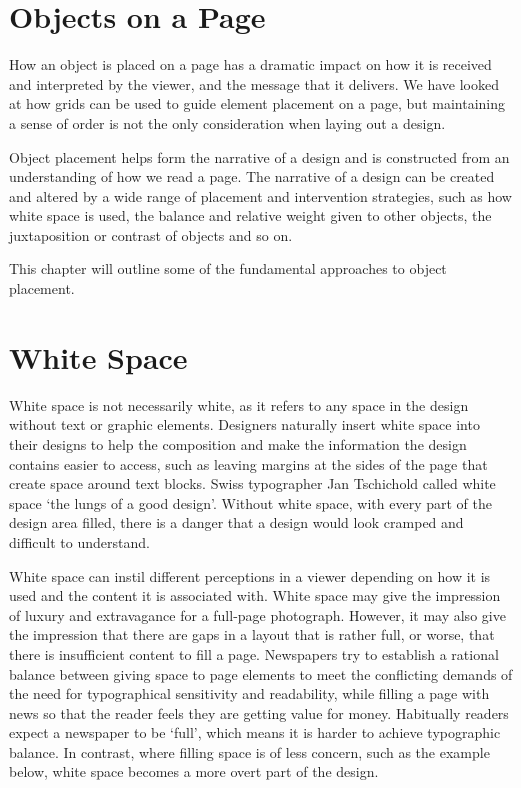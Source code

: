 \section{Objects on a Page}

How an object is placed on a page has a dramatic
impact on how it is received and interpreted by
the viewer, and the message that it delivers. We
have looked at how grids can be used to guide
element placement on a page, but maintaining a
sense of order is not the only consideration when
laying out a design.

Object placement helps form the narrative of
a design and is constructed from an understanding
of how we read a page. The narrative of a design
can be created and altered by a wide range of
placement and intervention strategies, such as
how white space is used, the balance and relative
weight given to other objects, the juxtaposition or
contrast of objects and so on.

This chapter will outline some of the
fundamental approaches to object placement.

\section{White Space}

White space is not necessarily white, as it refers to any space in the design
without text or graphic elements. Designers naturally insert white space into
their designs to help the composition and make the information the design
contains easier to access, such as leaving margins at the sides of the page that
create space around text blocks. Swiss typographer Jan Tschichold called white
space ‘the lungs of a good design’. Without white space, with every part of the
design area filled, there is a danger that a design would look cramped and
difficult to understand.

White space can instil different perceptions in a viewer depending on how it is
used and the content it is associated with. White space may give the impression
of luxury and extravagance for a full-page photograph. However, it may also give
the impression that there are gaps in a layout that is rather full, or worse, that
there is insufficient content to fill a page. Newspapers try to establish a rational
balance between giving space to page elements to meet the conflicting demands
of the need for typographical sensitivity and readability, while filling a page with
news so that the reader feels they are getting value for money. Habitually readers
expect a newspaper to be ‘full’, which means it is harder to achieve typographic
balance. In contrast, where filling space is of less concern, such as the example
below, white space becomes a more overt part of the design.



